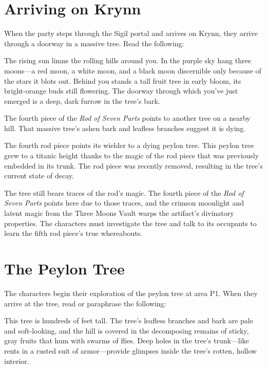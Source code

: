 \documentclass[10pt,a4paper,twoside,bg=print,twocolumn,openany,nodeprecatedcode]{dndbook}
\begin{document}
\section{Arriving on Krynn}
When the party steps through the Sigil portal and arrives on Krynn, they arrive through a doorway in a massive tree. Read the following:

\begin{DndReadAloud}{}
The rising sun limns the rolling hills around you. In the purple sky hang three moons—a red moon, a white moon, and a black moon discernible only because of the stars it blots out. Behind you stands a tall fruit tree in early bloom, its bright-orange buds still flowering. The doorway through which you've just emerged is a deep, dark furrow in the tree's bark.

The fourth piece of the \textit{Rod of Seven Parts} points to another tree on a nearby hill. That massive tree's ashen bark and leafless branches suggest it is dying.

\end{DndReadAloud}

The fourth rod piece points its wielder to a dying peylon tree. This peylon tree grew to a titanic height thanks to the magic of the rod piece that was previously embedded in its trunk. The rod piece was recently removed, resulting in the tree's current state of decay.

The tree still bears traces of the rod's magic. The fourth piece of the \textit{Rod of Seven Parts} points here due to those traces, and the crimson moonlight and latent magic from the Three Moons Vault warps the artifact's divinatory properties. The characters must investigate the tree and talk to its occupants to learn the fifth rod piece's true whereabouts.

\section{The Peylon Tree}
The characters begin their exploration of the peylon tree at area P1. When they arrive at the tree, read or paraphrase the following:

\begin{DndReadAloud}{}
This tree is hundreds of feet tall. The tree's leafless branches and bark are pale and soft-looking, and the hill is covered in the decomposing remains of sticky, gray fruits that hum with swarms of flies. Deep holes in the tree's trunk—like rents in a rusted suit of armor—provide glimpses inside the tree's rotten, hollow interior.

\end{DndReadAloud}
\end{document}
